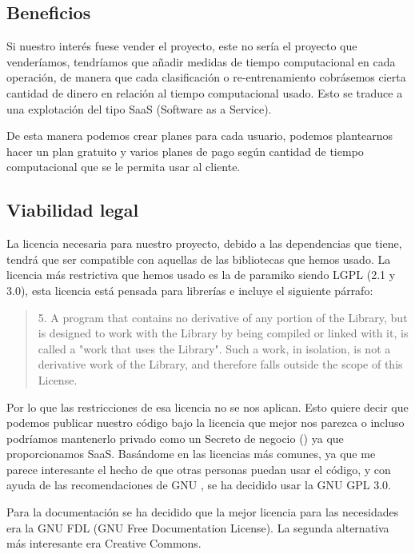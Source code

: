 \subsection{Beneficios}
Si nuestro interés fuese vender el proyecto, este no sería el proyecto que venderíamos, tendríamos que añadir medidas de tiempo computacional en cada operación, de manera que cada clasificación o re-entrenamiento cobrásemos cierta cantidad de dinero en relación al tiempo computacional usado. Esto se traduce a una explotación del tipo SaaS (Software as a Service).

De esta manera podemos crear planes para cada usuario, podemos plantearnos hacer un plan gratuito y varios planes de pago según cantidad de tiempo computacional que se le permita usar al cliente.


\subsection{Viabilidad legal}

La licencia necesaria para nuestro proyecto, debido a las dependencias que tiene, tendrá que ser compatible con aquellas de las bibliotecas que hemos usado. La licencia más restrictiva que hemos usado es la de paramiko siendo LGPL (2.1 y 3.0)\cite{LGPL}, esta licencia está pensada para librerías e incluye el siguiente párrafo:

\begin{quotation}5. A program that contains no derivative of any portion of the Library, but is designed to work with the Library by being compiled or linked with it, is called a "work that uses the Library". Such a work, in isolation, is not a derivative work of the Library, and therefore falls outside the scope of this License.
\end{quotation}

Por lo que las restricciones de esa licencia no se nos aplican. Esto quiere decir que podemos publicar nuestro código bajo la licencia que mejor nos parezca o incluso podríamos mantenerlo privado como un Secreto de negocio () ya que proporcionamos SaaS. Basándome en las licencias  más comunes, ya que me parece interesante el hecho de que otras personas puedan usar el código, y con ayuda de las recomendaciones de GNU \cite{gnurecs}, se ha decidido usar la GNU GPL 3.0.

Para la documentación se ha decidido que la mejor licencia para las necesidades era la GNU FDL (GNU Free Documentation License). La segunda alternativa más interesante era Creative Commons.

